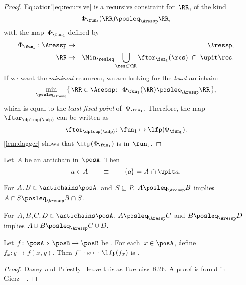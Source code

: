 \begin{proof}
    Equation!\cref{eq:recursive} is a recursive constraint for~$\RR$,
    of the kind
    \begin{equation*}
        \Phi_{\fun_{1}}(\RR)\posleq_{\Aressp}\RR,
    \end{equation*}
    with the map~$\Phi_{\fun_{1}}$ defined by
    \begin{eqnarray}
        \Phi_{\fun_{1}}:\Aressp & \to & \Aressp,\label{eq:bigphi}\\
        \RR & \mapsto & \Min_{\resleq}\bigcup_{\res\in\RR}\ftor_{\fun_{1}}(\res)\ \cap\ \upit\res.\nonumber
    \end{eqnarray}
    If we want the \emph{minimal} resources, we are looking for the \emph{least}
    antichain:
    \begin{equation*}
        \min_{\posleq_{\Aressp}}\{\,\RR\in\Aressp\colon\ \Phi_{\fun_{1}}(\RR)\posleq_{\Aressp}\RR\,\},
    \end{equation*}
    which is equal to the \emph{least fixed point }of~$\Phi_{\fun_{1}}$.
    Therefore, the map $\ftor_{\dploop(\adp)}$ can be written as
    \begin{equation}
        \ftor_{\dploop(\adp)}\colon\fun_{1}\mapsto\lfp(\Phi_{\fun_{1}}).\label{eq:loop_fixpoint}
    \end{equation}
    \cref{lem:dagger} shows that $\lfp(\Phi_{\fun_{1}})$ is \scottcontinuous
    in~$\fun_{1}$.
\end{proof}

\begin{lemma}
    \label{lem:antichain-write}Let~$A$ be an antichain in~$\posA$.
    Then
    \begin{equation*}
        a\in A\qquad\equiv\qquad\{a\}=A\,\cap\upit a.
    \end{equation*}
\end{lemma}

\begin{lemma}
    \label{lem:antichain_inter}For~$A,B\in\antichains\posA$, and~$S\subseteq P$,
    $A\posleq_{\Aressp}B$ implies $A\cap S\posleq_{\Aressp}B\cap S$.
\end{lemma}

\begin{lemma}
    \label{lem:antichain_union}For~$A,B,C,D\in\antichains\posA$, $A\posleq_{\Aressp}C$
    and $B\posleq_{\Aressp}D$ implies $A\cup B\posleq_{\Aressp}C\cup D.$
\end{lemma}

\begin{lemma}
    \label{lem:dagger}Let~$f\colon\posA\times\posB\to\posB$
    be \scottcontinuous. For each~$x\in\posA$, define $f_{x}:y\mapsto f(x,y).$
    Then $f^{\dagger}:x\mapsto\lfp(f_{x})$ is \scottcontinuous.
\end{lemma}
\begin{proof}
    Davey and Priestly~\cite{davey02} leave this as Exercise~8.26.
    A proof is found in Gierz~\etal~\cite[Exercise II-2.29]{gierz03continuous}.
\end{proof}

